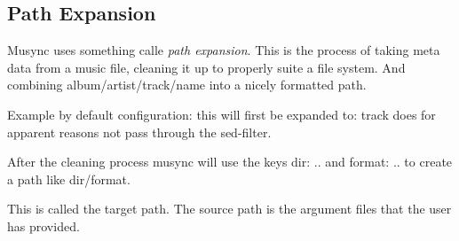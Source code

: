 \subsection{Path Expansion}
Musync uses something calle \emph{path expansion}.
This is the process of taking meta data from a music file, cleaning it up to properly suite a file system.
And combining album/artist/track/name into a nicely formatted path.

Example by default configuration:
this will first be expanded to:
track does for apparent reasons not pass through the sed-filter.

After the cleaning process musync will use the keys dir: .. and format: .. to create a path like dir/format.

This is called the target path. The source path is the argument files that the user has provided. 
